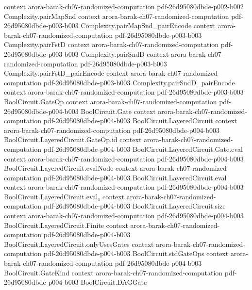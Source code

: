 \begin{theorem}
  {context}
  {arora-barak-ch07-randomized-computation}
  {pdf-26d95080dbde-p002-b002}
\proofstep
  {Complexity.pairMapSnd}
  {context}
  {arora-barak-ch07-randomized-computation}
  {pdf-26d95080dbde-p003-b003}
\proofstep
  {Complexity.pairMapSnd_pairEncode}
  {context}
  {arora-barak-ch07-randomized-computation}
  {pdf-26d95080dbde-p003-b003}
\proofstep
  {Complexity.pairFstD}
  {context}
  {arora-barak-ch07-randomized-computation}
  {pdf-26d95080dbde-p003-b003}
\proofstep
  {Complexity.pairSndD}
  {context}
  {arora-barak-ch07-randomized-computation}
  {pdf-26d95080dbde-p003-b003}
\proofstep
  {Complexity.pairFstD_pairEncode}
  {context}
  {arora-barak-ch07-randomized-computation}
  {pdf-26d95080dbde-p003-b003}
\proofstep
  {Complexity.pairSndD_pairEncode}
  {context}
  {arora-barak-ch07-randomized-computation}
  {pdf-26d95080dbde-p003-b003}
\proofstep
  {BoolCircuit.GateOp}
  {context}
  {arora-barak-ch07-randomized-computation}
  {pdf-26d95080dbde-p004-b003}
\proofstep
  {BoolCircuit.Gate}
  {context}
  {arora-barak-ch07-randomized-computation}
  {pdf-26d95080dbde-p004-b003}
\proofstep
  {BoolCircuit.LayeredCircuit}
  {context}
  {arora-barak-ch07-randomized-computation}
  {pdf-26d95080dbde-p004-b003}
\proofstep
  {BoolCircuit.LayeredCircuit.GateOp.id}
  {context}
  {arora-barak-ch07-randomized-computation}
  {pdf-26d95080dbde-p004-b003}
\proofstep
  {BoolCircuit.LayeredCircuit.Gate.eval}
  {context}
  {arora-barak-ch07-randomized-computation}
  {pdf-26d95080dbde-p004-b003}
\proofstep
  {BoolCircuit.LayeredCircuit.evalNode}
  {context}
  {arora-barak-ch07-randomized-computation}
  {pdf-26d95080dbde-p004-b003}
\proofstep
  {BoolCircuit.LayeredCircuit.eval}
  {context}
  {arora-barak-ch07-randomized-computation}
  {pdf-26d95080dbde-p004-b003}
\proofstep
  {BoolCircuit.LayeredCircuit.eval₁}
  {context}
  {arora-barak-ch07-randomized-computation}
  {pdf-26d95080dbde-p004-b003}
\proofstep
  {BoolCircuit.LayeredCircuit.size}
  {context}
  {arora-barak-ch07-randomized-computation}
  {pdf-26d95080dbde-p004-b003}
\proofstep
  {BoolCircuit.LayeredCircuit.Finite}
  {context}
  {arora-barak-ch07-randomized-computation}
  {pdf-26d95080dbde-p004-b003}
\proofstep
  {BoolCircuit.LayeredCircuit.onlyUsesGates}
  {context}
  {arora-barak-ch07-randomized-computation}
  {pdf-26d95080dbde-p004-b003}
\proofstep
  {BoolCircuit.stdGateOps}
  {context}
  {arora-barak-ch07-randomized-computation}
  {pdf-26d95080dbde-p004-b003}
\proofstep
  {BoolCircuit.GateKind}
  {context}
  {arora-barak-ch07-randomized-computation}
  {pdf-26d95080dbde-p004-b003}
\proofstep
  {BoolCircuit.DAGGate}

\end{theorem}
